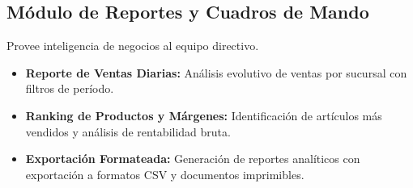 \subsection{Módulo de Reportes y Cuadros de Mando}
Provee inteligencia de negocios al equipo directivo.
\begin{itemize}
    \item \textbf{Reporte de Ventas Diarias:} Análisis evolutivo de ventas por sucursal con filtros de período.
    \item \textbf{Ranking de Productos y Márgenes:} Identificación de artículos más vendidos y análisis de rentabilidad bruta.
    \item \textbf{Exportación Formateada:} Generación de reportes analíticos con exportación a formatos CSV y documentos imprimibles.
\end{itemize}

